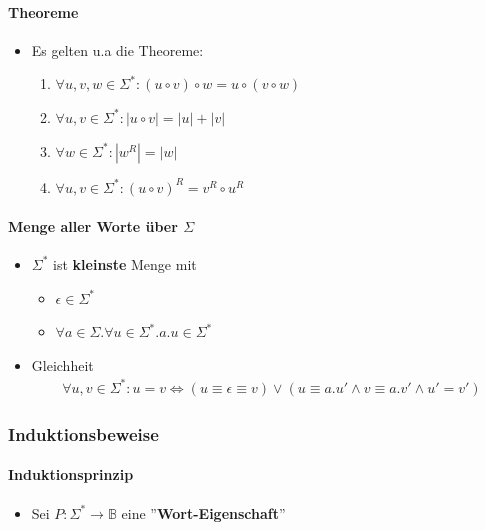 \documentclass{scrartcl}
\begin{document}
\paragraph{Theoreme}

\begin{itemize}
	\item Es gelten u.a die Theoreme:
	\begin{enumerate}
		\item $\forall u,v,w \in \Sigma^*: (u \circ v) \circ w = u \circ (v \circ w)$
		\item $\forall u,v \in \Sigma^*: |u \circ v| = |u| + |v|$
		\item $\forall w \in \Sigma^*: |w^R| = |w|$
		\item $\forall u,v \in \Sigma^*: (u \circ v)^R = v^R \circ u^R$
	\end{enumerate}
\end{itemize}

\paragraph{Menge aller Worte über $\Sigma$}

\begin{itemize}
	\item $\Sigma^*$ ist \textbf{kleinste} Menge mit
	\begin{itemize}
		\item $\epsilon \in \Sigma^*$
		\item $\forall a \in \Sigma. \forall u \in \Sigma^*. a.u \in \Sigma^*$
	\end{itemize}
	\item Gleichheit
	\begin{align*}
		\forall u,v \in \Sigma^*: u = v \iff (u \equiv \epsilon \equiv v) \vee (u \equiv a.u' \wedge v \equiv a.v' \wedge u' = v')
	\end{align*}
\end{itemize}

\subsubsection{Induktionsbeweise}

\paragraph{Induktionsprinzip}

\begin{itemize}
	\item Sei $P: \Sigma^* \rightarrow \mathbb{B}$ eine ''\textbf{Wort-Eigenschaft}''
\end{itemize}
\end{document}
